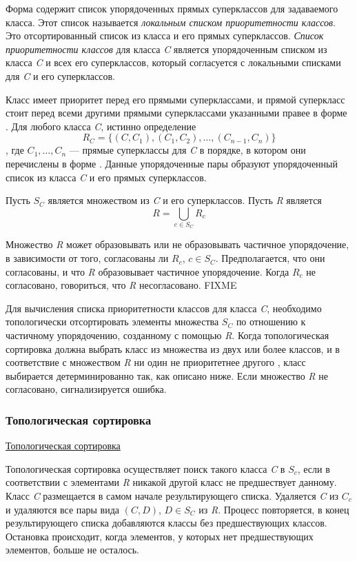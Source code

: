 Форма  содержит список упорядоченных прямых суперклассов для
задаваемого класса. Этот список называется \emph{локальным списком 
приоритетности  классов}. Это отсортированный список из класса и его прямых 
суперклассов. \emph{Список приоритетности классов} для класса \emph{C} является
упорядоченным списком из класса \emph{C} и всех его суперклассов, который
согласуется с локальными списками для \emph{C} и его суперклассов.

Класс имеет приоритет перед его прямыми суперклассами, и прямой суперкласс стоит
перед всеми другими прямыми суперклассами указанными правее в форме
.
Для любого класса \emph{C},
истинно определение
$$R_C=\{(C,C_1),(C_1,C_2),\ldots,(C_{n-1},C_{n})\}$$
, где $C_1,\ldots,C_{n}$ --- прямые суперклассы для \emph{C} в порядке, в
котором они перечислены в форме . Данные упорядоченные пары
образуют упорядоченный список из класса \emph{C} и его прямых суперклассов.

Пусть $S_C$ является множеством из \emph{C} и его суперклассов. Пусть \emph{R}
является 
$$R=\bigcup_{\textstyle c\in {S_{C}}} R_{c}$$

Множество \emph{R} может образовывать или не образовывать частичное
упорядочение, в зависимости от того, согласованы ли $R_{c}$, $c\in
S_{C}$. Предполагается, что они согласованы, и что \emph{R} образовывает
частичное упорядочение. Когда $R_{c}$ не согласовано, говориться, что \emph{R}
несогласовано. FIXME 

Для вычисления списка приоритетности классов для класса \emph{C}, необходимо
топологически отсортировать элементы множества $S_{C}$ по отношению к частичному
упорядочению, созданному с помощью \emph{R}. Когда топологическая сортировка
должна выбрать класс из множества из двух или более классов, и в соответствие с
множеством \emph{R} ни один не приоритетнее другого , класс
выбирается детерминированно так, как описано ниже.
Если множество \emph{R} не согласовано, сигнализируется ошибка.

\subsubsection{Топологическая сортировка}

\href{http://ru.wikipedia.org/wiki/Топологическая_сортировка}{Топологическая
  сортировка}

Топологическая сортировка осуществляет поиск такого класса \emph{C} в $S_{c}$,
если в соответствии с элементами \emph{R} никакой другой класс не предшествует
данному. Класс \emph{C} размещается в самом начале результирующего
списка. Удаляется \emph{C} из $C_{c}$ и удаляются все пары вида $(C,D)$,
$D\in S_{C}$ из \emph{R}. Процесс повторяется, в конец результирующего списка
добавляются классы без предшествующих классов. Остановка происходит,
когда элементов, у которых нет предшествующих элементов, больше не осталось.

